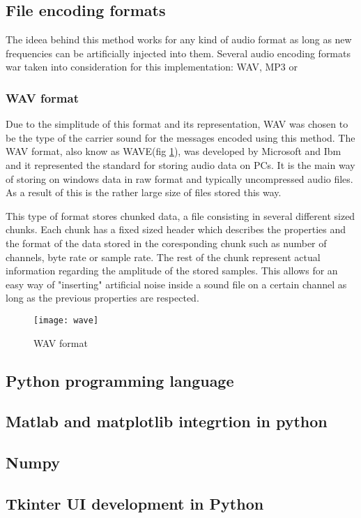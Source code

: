 \documentclass[12pt]{report}
\begin{document}
\subsection{File encoding formats}
The ideea behind this method works for any kind of audio format as long as new frequencies can be artificially injected into them. Several audio encoding formats war taken into consideration for this implementation: WAV, MP3 or  
\subsubsection{WAV format}
Due to the simplitude of this format and its representation, WAV was chosen to be the type of the carrier sound for the messages encoded using this method.
The WAV format, also know as WAVE(fig \ref{fig:wave}), was developed by Microsoft and Ibm and it represented the standard for storing audio data on PCs. It is the main way of storing on windows data in raw format and typically uncompressed audio files. As a result of this is the rather large size of files stored this way.

This type of format stores chunked data, a file consisting in several different sized chunks. Each chunk has a fixed sized header which describes the properties and the format of the data stored in the coresponding chunk such as number of channels, byte rate or sample rate. The rest of the chunk represent actual information regarding the amplitude of the stored samples. This allows for an easy way of "inserting" artificial noise inside a sound file on a certain channel as long as the previous properties are respected.

\begin{figure}[h]
\centering
\texttt{[image: wave]}
\caption{WAV format}
\label{fig:wave}
\end{figure}

\subsection{Python programming language}
\subsection{Matlab and matplotlib integrtion in python}
\subsection{Numpy}
\subsection{Tkinter UI development in Python}
\end{document}
